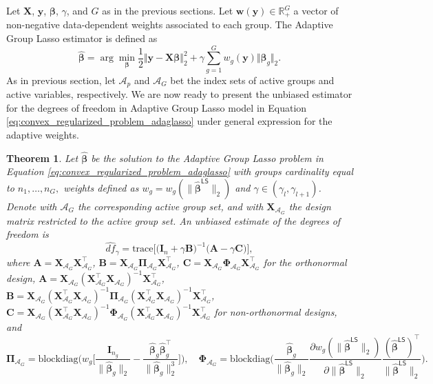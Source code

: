\documentclass[a4paper, 12pt]{article}
\newcommand{\Aset}{\mathcal{A}}
\newcommand{\betahat}{\widehat{\boldsymbol\beta}}
\newcommand{\trace}{\mathrm{trace}}
\newcommand{\T}{\top}
\def\bbeta{\boldsymbol{\beta}}
\def\bPi{\boldsymbol{\Pi}}
\def\bPhi{\boldsymbol{\Phi}}
\def\bw{\boldsymbol{w}}
\def\by{\boldsymbol{y}}
\def\bA{\mathbf{A}}
\def\bB{\mathbf{B}}
\def\bC{\mathbf{C}}
\def\bI{\mathbf{I}}
\def\bX{\mathbf{X}}
\def\bw{\mathbf{w}}
\def\by{\mathbf{y}}
\newtheorem{theorem}{Theorem}
\begin{document}
Let $\bX$, $\by$, $\bbeta$, $\gamma$, and $G$ as in the previous sections. Let  $\bw(\by) \in \mathbb{R}^G_+$ a vector of non-negative data-dependent weights associated to each group. The Adaptive Group Lasso estimator is defined as
\begin{equation}
\label{eq:convex_regularized_problem_adaglasso}
\widehat{\boldsymbol{\beta}}=\arg\min_{\bbeta} \frac{1}{2}\Vert\by-\bX \bbeta \Vert_2^2+\gamma \sum_{g=1}^Gw_g(\by)\Vert \bbeta_g\Vert_2.
\end{equation}
%
As in previous section, let $\Aset_p$ and $\Aset_G$ bet the index sets of active groups and active variables, respectively.
We are now ready to present the unbiased estimator for the degrees of freedom in Adaptive Group Lasso model in Equation \eqref{eq:convex_regularized_problem_adaglasso} under  general expression for the adaptive weights.
%
\begin{theorem}
\label{th:df_adaglasso_general_weights}
Let $\betahat$ be the solution to the Adaptive Group Lasso problem in Equation \eqref{eq:convex_regularized_problem_adaglasso} with groups cardinality equal to $n_1, \ldots, n_G,$ weights defined as $w_g = w_g(\lVert \widehat{\bbeta}^\mathsf{LS} \rVert_2)$ and $\gamma \in (\gamma_l, \gamma_{l+1})$. Denote with $\Aset_G$ the corresponding active group set, and with $\bX_{\Aset_G}$ the design matrix restricted to the active group set. An unbiased estimate
of the degrees of freedom is
\begin{equation}
\label{eq:dof_adaglasso_general_weights}
\widehat{df}_\gamma = \trace\big[\big(\bI_n + \gamma \bB \big)^{-1} \big(\bA - \gamma \bC \big)\big],
\end{equation}
where $\bA = \bX_{\Aset_G} \bX_{\Aset_G}^{\T}$, $\bB = \bX_{\Aset_G} \bPi_{\Aset_G} \bX_{\Aset_G}^{\T}$, $\bC = \bX_{\Aset_G} \bPhi_{\Aset_G} \bX_{\Aset_G}^{\T}$ for the orthonormal design, $\bA = \bX_{\Aset_G}(\bX_{\Aset_G}^{\T} \bX_{\Aset_G})^{-1}\bX_{\Aset_G}^{\T}$, $\bB = \bX_{\Aset_G}(\bX_{\Aset_G}^{\T} \bX_{\Aset_G})^{-1} \bPi_{\Aset_G}(\bX_{\Aset_G}^{\T} \bX_{\Aset_G})^{-1}\bX_{\Aset_G}^{\T}$, \\
$\bC = \bX_{\Aset_G} (\bX_{\Aset_G}^{\T} \bX_{\Aset_G})^{-1}\bPhi_{\Aset_G} (\bX_{\Aset_G}^{\T} \bX_{\Aset_G})^{-1}\bX_{\Aset_G}^{\T}$ for non-orthonormal designs, and
\begin{equation*}
   \bPi_{\Aset_G} = \mathrm{blockdiag}\bigg( w_g \bigg[ \frac{\bI_{n_g}}{\lVert \widehat{\bbeta}_g \rVert_2} - \frac{\widehat{\bbeta}_g \widehat{\bbeta}_g^{\T}}{\lVert \widehat{\bbeta}_g \rVert_2^3} \bigg] \bigg), \quad \bPhi_{\Aset_G} = \mathrm{blockdiag}\bigg(  \frac{\widehat{\bbeta}_g}{\lVert \widehat{\bbeta}_g \rVert_2 } \frac{\partial w_g(\lVert \widehat{\bbeta}^\mathsf{LS}\rVert_2)}{\partial \lVert\widehat{\bbeta}^\mathsf{LS} \rVert_2}\frac{(\widehat{\bbeta}^\mathsf{LS})^{\T}}{\lVert \widehat{\bbeta}^\mathsf{LS} \rVert_2}\bigg). 
\end{equation*}
\end{theorem}
\end{document}
